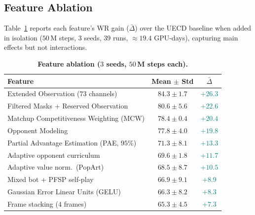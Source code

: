 \documentclass[conference]{IEEEtran}
\newcommand{\code}[1]{{\ttfamily\hyphenchar\font=45\relax #1}}
\begin{document}
\subsection{Feature Ablation}
\label{sec:feat-ablation}

Table~\ref{tab:feat-ablation-summary} reports each feature's WR gain ($\bar{\Delta}$) over the \code{UECD} baseline when added in isolation ($50$\,M steps, $3$ seeds, $39$ runs, $\approx\!19.4$ GPU-days), capturing main effects but not interactions.

\begin{table}[!b]
\centering
\caption{\textbf{Feature ablation ($3$ seeds, $50$\,M steps each).}}
\label{tab:feat-ablation-summary}
\footnotesize
\setlength{\tabcolsep}{4pt}
\begin{tabularx}{\linewidth}{@{}>{\raggedright\arraybackslash}X | c c@{}}
  \toprule
  \textbf{Feature} & \textbf{Mean $\pm$ Std} & \textbf{$\bar{\Delta}$} \\
  \midrule
  Extended Observation ($73$ channels)~\cite{goodfriendCompetitionWinningDeep2024}    & $84.3 \pm 1.7$ & \textcolor{teal}{$+26.3$} \\
  Filtered Masks + Reserved Observation~\cite{goodfriendCompetitionWinningDeep2024}   & $80.6 \pm 5.6$ & \textcolor{teal}{$+22.6$} \\
  Matchup Competitiveness Weighting (MCW)                                             & $78.4 \pm 0.4$ & \textcolor{teal}{$+20.4$} \\
  Opponent Modeling~\cite{manandharReinforcementActorcriticLearning2024}              & $77.8 \pm 4.0$ & \textcolor{teal}{$+19.8$} \\
  \midrule
  Partial Advantage Estimation (PAE, $95$\%)~\cite{jinPartialAdvantageEstimator2025}  & $71.3 \pm 8.1$ & \textcolor{teal}{$+13.3$} \\
  Adaptive opponent curriculum                                                        & $69.6 \pm 1.8$ & \textcolor{teal}{$+11.7$} \\
  Adaptive value norm.\ (PopArt)~\cite{vanhasseltLearningValuesMany2016}              & $68.5 \pm 8.7$ & \textcolor{teal}{$+10.5$} \\
  Mixed bot + PFSP self-play~\cite{vinyalsGrandmasterLevelStarCraft2019}              & $66.9 \pm 9.1$ & \textcolor{teal}{$+8.9$} \\
  Gaussian Error Linear Units (GELU)~\cite{hendrycksGaussianErrorLinear2016}          & $66.3 \pm 8.2$ & \textcolor{teal}{$+8.3$} \\
  Frame stacking ($4$ frames)~\cite{mnihHumanlevelControlDeep2015}                    & $65.3 \pm 4.5$ & \textcolor{teal}{$+7.3$} \\

\end{tabularx}
\end{table}
\end{document}
